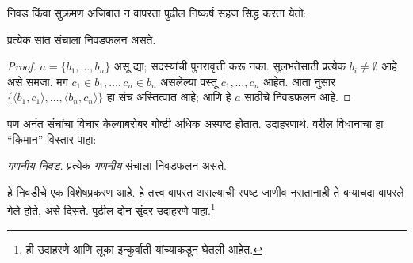 \documentclass[../../../include/open-logic-section]{subfiles}
\begin{document}

निवड किंवा सुक्रमण अजिबात न वापरता पुढील निष्कर्ष सहज सिद्ध करता येतो:

\begin{lem}[$\Zminus$ मध्ये]
प्रत्येक सांत संचाला निवडफलन असते.
\end{lem}

\begin{proof}
$a = \{b_1, \ldots, b_n\}$ असू द्या; सदस्यांची पुनरावृत्ती करू नका. सुलभतेसाठी प्रत्येक $b_i
\neq \emptyset$ आहे असे समजा. मग $c_1 \in b_1, \ldots, c_n \in b_n$ असलेल्या वस्तू $c_1, \ldots, c_n$ आहेत. आता  नुसार $\{\langle b_1,
c_1\rangle , \ldots, \langle b_n, c_n\rangle\}$ हा संच अस्तित्वात आहे; आणि हे $a$ साठीचे निवडफलन आहे.
\end{proof}

पण अनंत संचांचा विचार केल्याबरोबर गोष्टी अधिक अस्पष्ट होतात. उदाहरणार्थ, वरील विधानाचा हा “किमान” विस्तार पाहा:

\begin{defish}
\emph{गणनीय निवड.} प्रत्येक \emph{गणनीय} संचाला निवडफलन असते.
\end{defish}

हे निवडीचे एक विशेषप्रकरण आहे. हे तत्त्व वापरत असल्याची स्पष्ट जाणीव नसतानाही ते बऱ्याचदा वापरले गेले होते, असे दिसते. पुढील दोन सुंदर उदाहरणे पाहा.\footnote{ही उदाहरणे \citet[\S9.4]{Potter2004} आणि लूका इन्कुर्वाती यांच्याकडून घेतली आहेत.}
\end{document}
